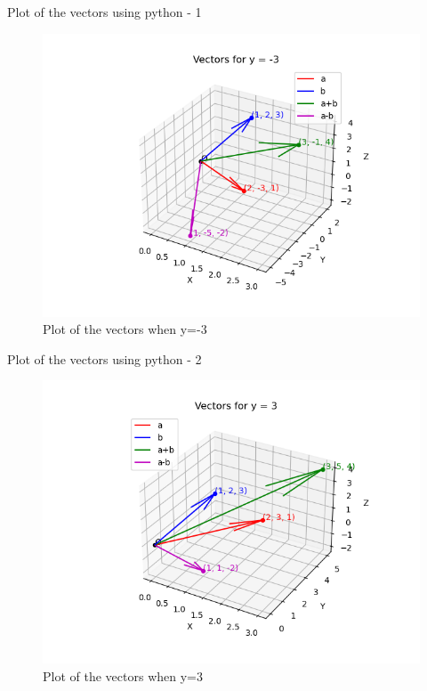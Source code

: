 \documentclass{beamer}
\begin{document}
 \begin{frame}{Plot of the vectors using python - 1}
     \begin{figure}
     \centering
     \includegraphics[width=0.7\linewidth]{figs/Fig1.png}
     \caption{Plot of the vectors when y=-3}
     \label{Fig2}
 \end{figure}
 \end{frame}
\begin{frame}{Plot of the vectors using python - 2}
    \begin{figure}
     \centering
     \includegraphics[width=0.7\linewidth]{figs/Fig2.png}
     \caption{Plot of the vectors when y=3}
     \label{fig:placeholder}
 \end{figure}
\end{frame} 
 
\end{document}
